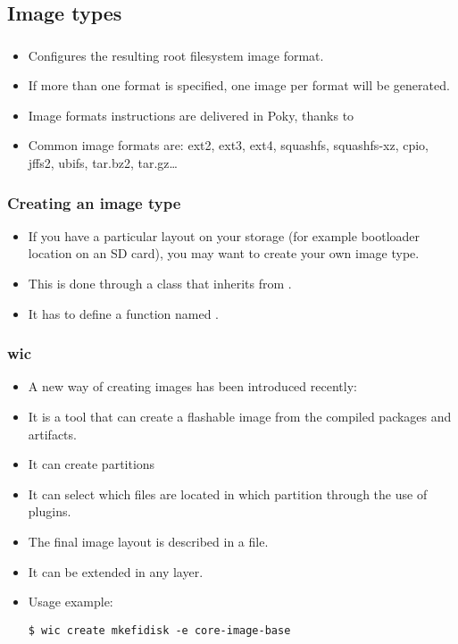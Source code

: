 \subsection{Image types}

\begin{frame}
  \frametitle{}
  \begin{itemize}
    \item Configures the resulting root filesystem image format.
    \item If more than one format is specified, one image per format
      will be generated.
    \item Image formats instructions are delivered in Poky, thanks to
    \item Common image formats are: ext2, ext3, ext4, squashfs,
      squashfs-xz, cpio, jffs2, ubifs, tar.bz2, tar.gz\dots
  \end{itemize}
\end{frame}

\begin{frame}
  \frametitle{Creating an image type}
  \begin{itemize}
    \item If you have a particular layout on your storage (for example
      bootloader location on an SD card), you may want to create your
      own image type.
    \item This is done through a class that inherits from
      .
    \item It has to define a function named .
  \end{itemize}
\end{frame}

\begin{frame}[fragile]
  \frametitle{wic}
  \begin{itemize}
    \item A new way of creating images has been introduced recently:
    \item It is a tool that can create a flashable image from the
      compiled packages and artifacts.
    \item It can create partitions
    \item It can select which files are located in
      which partition through the use of plugins.
    \item The final image layout is described in a  file.
    \item It can be extended in any layer.
    \item Usage example:
      \begin{block}{}
        \begin{verbatim}
$ wic create mkefidisk -e core-image-base
        \end{verbatim}
      \end{block}
  \end{itemize}
\end{frame}

